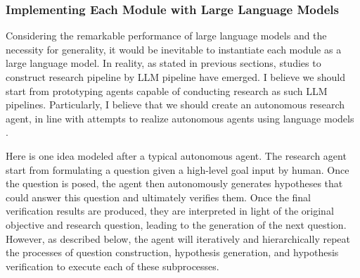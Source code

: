 
\subsubsection{Implementing Each Module with Large Language Models}

Considering the remarkable performance of large language models and the necessity for generality, it would be inevitable to instantiate each module as a large language model. In reality, as stated in previous sections, studies to construct research pipeline by LLM pipeline have emerged. I believe we should start from prototyping agents capable of conducting research as such LLM pipelines. Particularly, I believe that we should create an autonomous research agent, in line with attempts to realize autonomous agents using language models \cite{wang2023survey,xi2023rise}.

Here is one idea modeled after a typical autonomous agent. The research agent start from formulating a question given a high-level goal input by human. Once the question is posed, the agent then autonomously generates hypotheses that could answer this question and ultimately verifies them. Once the final verification results are produced, they are interpreted in light of the original objective and research question, leading to the generation of the next question. However, as described below, the agent will iteratively and hierarchically repeat the processes of question construction, hypothesis generation, and hypothesis verification to execute each of these subprocesses.

